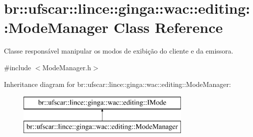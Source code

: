 \hypertarget{classbr_1_1ufscar_1_1lince_1_1ginga_1_1wac_1_1editing_1_1ModeManager}{
\section{br::ufscar::lince::ginga::wac::editing::ModeManager Class Reference}
\label{classbr_1_1ufscar_1_1lince_1_1ginga_1_1wac_1_1editing_1_1ModeManager}
}


Classe responsável manipular os modos de exibição do cliente e da emissora.  




{\ttfamily \#include $<$ModeManager.h$>$}

Inheritance diagram for br::ufscar::lince::ginga::wac::editing::ModeManager:\begin{figure}[H]
\begin{center}
\leavevmode
\includegraphics[height=2cm]{classbr_1_1ufscar_1_1lince_1_1ginga_1_1wac_1_1editing_1_1ModeManager}
\end{center}
\end{figure}
